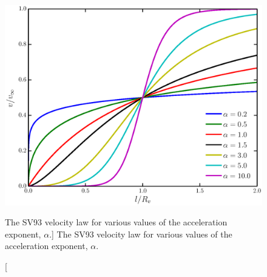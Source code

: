 \begin{figure}
\centering
\includegraphics[width=1.0\textwidth]{figures/05-cvpaper/acc_law.eps}
\caption
[The SV93 velocity law for various values of the
acceleration exponent, $\alpha$.]
{
The SV93 velocity law for various values of the
acceleration exponent, $\alpha$.
} 
\label{acc_law}
\end{figure}




